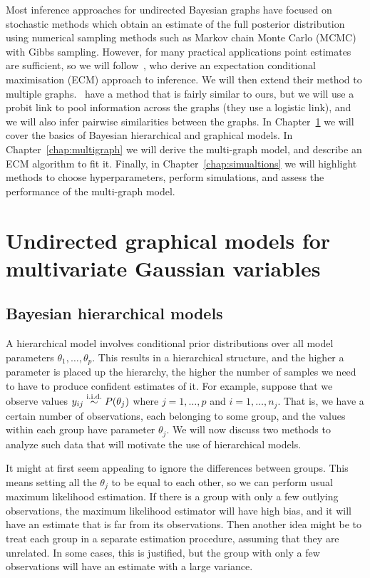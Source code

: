 \documentclass[a4paper, 11pt, oneside]{report}
\newcommand{\iid}{\stackrel{\textmd{i.i.d.}}{\sim}}
\newcommand{\1}{\mathds{1}}
\begin{document}
Most inference approaches for undirected Bayesian graphs have focused on
stochastic methods which obtain an estimate of the full posterior distribution
using numerical sampling methods such as Markov chain Monte Carlo (MCMC) with
Gibbs sampling. However, for many practical applications
point estimates are sufficient, so we will follow~\citet{limcco-2017}, who
derive an expectation conditional maximisation (ECM) approach to inference. We
will then extend their method to multiple graphs.~\citet{luke2017} have a method that is
fairly similar to ours, but we will use a probit link to pool
information across the graphs (they use a logistic link), and we will also infer
pairwise similarities between the graphs.
In Chapter~\ref{chap:graphs} we will cover the basics of Bayesian hierarchical and graphical models. In Chapter~\ref{chap:multigraph} we will derive the multi-graph model, and describe an ECM algorithm to fit it. Finally, in Chapter~\ref{chap:simualtions} we will highlight methods to choose hyperparameters, perform simulations, and assess the performance of the multi-graph model.

\chapter{Undirected graphical models for multivariate Gaussian
  variables}\label{chap:graphs}

\section{Bayesian hierarchical models}
A hierarchical model involves conditional prior distributions over all model parameters
$\theta_1, \dots, \theta_p$. This results in a hierarchical structure, and the
higher a parameter is placed
up the hierarchy, the higher the number of samples we need to have to produce
confident estimates of it.
For example, suppose that we observe values $y_{ij} \iid P(\theta_j)$ where $j=1,\dots,p$ and
$i=1,\dots,n_j$. That is, we have a certain number of observations,
each belonging to some group, and the values within each group have
parameter $\theta_j$. We will now discuss two methods to analyze such data
that will motivate the use of hierarchical models.

It might at first seem appealing to ignore the differences between groups. This
means setting all the $\theta_j$ to be equal to each other, so we can perform
usual maximum likelihood estimation. If there is a group with only a few
outlying observations, the maximum likelihood estimator will have high bias, and it will have an estimate that is far from its observations.
Then another idea might be to treat each group in a separate estimation procedure, assuming
that they are unrelated. In some cases, this is
justified, but the group with only a few
observations will have an estimate with a large variance.
\end{document}
